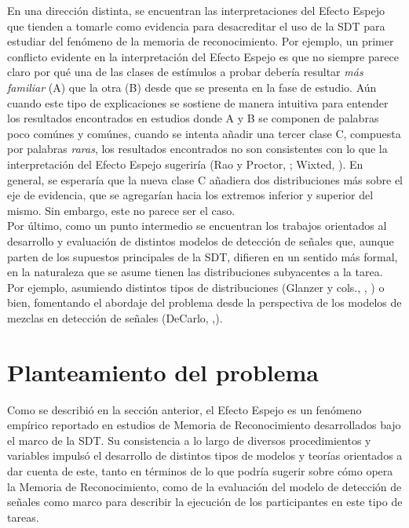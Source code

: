 En una dirección distinta, se encuentran las interpretaciones del Efecto Espejo que tienden a tomarle como evidencia para desacreditar el uso de la SDT para estudiar del fenómeno de la memoria de reconocimiento. Por ejemplo, un primer conflicto evidente en la interpretación del Efecto Espejo es que no siempre parece claro por qué una de las clases de estímulos a probar debería resultar \textit{más familiar} (A) que la otra (B) desde que se presenta en la fase de estudio. Aún cuando este tipo de explicaciones se sostiene de manera intuitiva para entender los resultados encontrados en estudios donde A y B se componen de palabras poco comúnes y comúnes, cuando se intenta añadir una tercer clase C, compuesta por palabras \textit{raras}, los resultados encontrados no son consistentes con lo que la interpretación del Efecto Espejo sugeriría (Rao y Proctor, \citeyear{Rao1984}; Wixted, \citeyear{Wixted1992}). En general, se esperaría que la nueva clase C añadiera dos distribuciones más sobre el eje de evidencia, que se agregarían hacia los extremos inferior y superior del mismo. Sin embargo, este no parece ser el caso.\\

Por último, como un punto intermedio se encuentran los trabajos orientados al desarrollo y evaluación de distintos modelos de detección de señales que, aunque parten de los supuestos principales de la SDT, difieren en un sentido más formal, en la naturaleza que se asume tienen las distribuciones subyacentes a la tarea. Por ejemplo, asumiendo distintos tipos de distribuciones (Glanzer y cols., \citeyear{Glanzer1993}, \citeyear{Glanzer2009}) o bien, fomentando el abordaje del problema desde la perspectiva de los modelos de mezclas en detección de señales (DeCarlo, \citeyear{DeCarlo2002} ,\citeyear{DeCarlo2007}).\\

\section{Planteamiento del problema}

Como se describió en la sección anterior, el Efecto Espejo es un fenómeno empírico reportado en estudios de Memoria de Reconocimiento desarrollados bajo el marco de la SDT. Su consistencia a lo largo de diversos procedimientos y variables impulsó el desarrollo de distintos tipos de modelos y teorías orientados a dar cuenta de este, tanto en términos de lo que podría sugerir sobre cómo opera la Memoria de Reconocimiento, como de la evaluación del modelo de detección de señales como marco para describir la ejecución de los participantes en este tipo de tareas.\\

